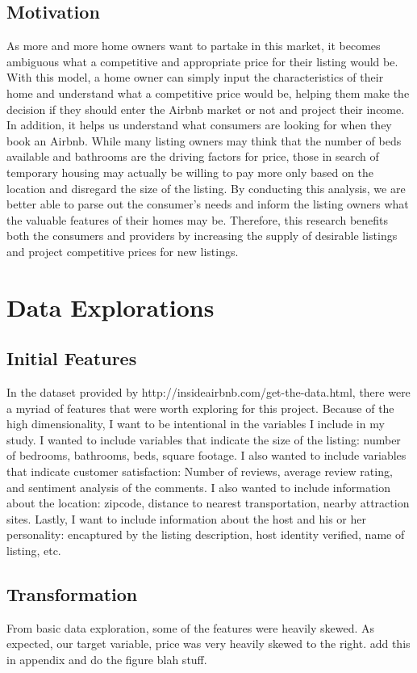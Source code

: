 \documentclass[twocolumn,10pt]{asme2ej}
\begin{document}
\subsection{Motivation}
As more and more home owners want to partake in this market, it becomes ambiguous what a competitive and appropriate price for their listing would be. With this model, a home owner can simply input the characteristics of their home and understand what a competitive price would be, helping them make the decision if they should enter the Airbnb market or not and project their income. In addition, it helps us understand what consumers are looking for when they book an Airbnb. While many listing owners may think that the number of beds available and bathrooms are the driving factors for price, those in search of temporary housing may actually be willing to pay more only based on the location and disregard the size of the listing. By conducting this analysis, we are better able to parse out the consumer's needs and inform the listing owners what the valuable features of their homes may be. Therefore, this research benefits both the consumers and providers by increasing the supply of desirable listings and project competitive prices for new listings.
\section{Data Explorations}
\subsection{Initial Features}
In the dataset provided by http://insideairbnb.com/get-the-data.html, there were a myriad of features that were worth exploring for this project.  Because of the high dimensionality, I want to be intentional in the variables I include in my study. I wanted to include variables that indicate the size of the listing: number of bedrooms, bathrooms, beds, square footage. I also wanted to include variables that indicate customer satisfaction: Number of reviews, average review rating, and sentiment analysis of the comments. I also wanted to include information about the location: zipcode, distance to nearest transportation, nearby attraction sites. Lastly, I want to include information about the host and his or her personality: encaptured by the listing description, host identity verified, name of listing, etc. 

\subsection{Transformation}
From basic data exploration, some of the features were heavily skewed. As expected, our target variable, price was very heavily skewed to the right.  add this in appendix and do the figure blah stuff.
\end{document}
